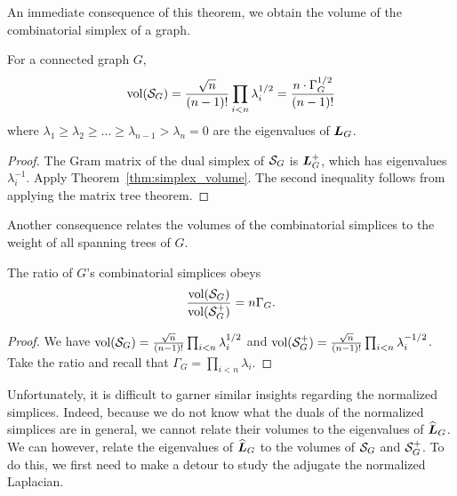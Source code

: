 An immediate consequence of this theorem, we obtain the volume of the combinatorial simplex of a graph. 

\begin{corollary}
	\label{cor:vol(SG)}
	For a connected graph $G$, 
	\begin{equation*}
	\textnormal{vol}(\mathcal{S}_G) = \frac{\sqrt{n}}{(n-1)!}\prod_{i<n}\lambda_i^{1/2}  = \frac{n \cdot\Gamma_G^{1/2}}{(n-1)!}
	\end{equation*}
	where  $\lambda_1\geq \lambda_2\geq \dots\geq\lambda_{n-1}>  \lambda_n=0$  are the eigenvalues of $\vb*{L}_G$. 
\end{corollary}
\begin{proof}
	The Gram matrix of the dual simplex of $\mathcal{S}_G$ is $\vb*{L}_G^+$,  which has eigenvalues $\lambda_i^{-1}$. Apply  Theorem~\ref{thm:simplex_volume}. The second  inequality follows from applying the matrix tree theorem.  
\end{proof}

Another consequence relates the volumes of the combinatorial simplices to the weight  of all spanning trees of $G$.  

\begin{corollary}
	\label{cor:vol(SG)/vol(S+)}
	The ratio of $G$'s combinatorial simplices  obeys
	\begin{align*}
	\frac{\textnormal{vol}(\mathcal{S}_G)}{\textnormal{vol}(\mathcal{S}_G^+)} = n\Gamma_G. 
	\end{align*}
\end{corollary} 
\begin{proof}
	We have $\textnormal{vol}(\mathcal{S}_G) = \frac{\sqrt{n}}{(n-1)!}\prod_{i<n}{\lambda_i^{1/2}}$ and  $\textnormal{vol}(\mathcal{S}_G^+) = \frac{\sqrt{n}}{(n-1)!}\prod_{i<n}{\lambda_i^{-1/2}}$. Take the  ratio   and recall that $\Gamma_G = \prod_{i<n}\lambda_i$.  
\end{proof}

Unfortunately,   it is  difficult to  garner  similar insights regarding the  normalized simplices. Indeed, because we do  not know what the duals of the normalized simplices are in general,  we cannot relate their volumes to the eigenvalues of $\widehat{\vb*{L}}_G$. We can however, relate  the eigenvalues of $\widehat{\vb*{L}}_G$ to the volumes of $\mathcal{S}_G$ and  $\mathcal{S}_G^+$.  To  do  this, we first need  to make a detour to  study the adjugate the normalized Laplacian. 

